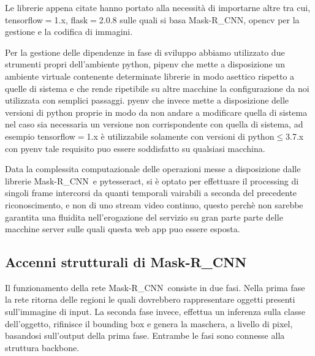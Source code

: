\documentclass[12pt,a4paper]{article}
\newcommand{\mrcnn}{Mask-R\_CNN}
\begin{document}
Le librerie appena citate hanno portato alla necessità di importarne
altre tra cui, tensorflow$=$1.x, flask$=$2.0.8 sulle quali si basa
\mrcnn, opencv per la gestione e la codifica di immagini.

Per la gestione delle dipendenze in fase di sviluppo abbiamo utilizzato
due strumenti propri dell'ambiente python, pipenv che mette a
disposizione un ambiente virtuale contenente determinate librerie in
modo asettico rispetto a quelle di sistema e che rende ripetibile su
altre macchine la configurazione da noi utilizzata con semplici
passaggi. pyenv che invece mette a disposizione delle versioni di python
proprie in modo da non andare a modificare quella di sistema nel caso
sia necessaria un versione non corrispondente con quella di sistema, ad
esempio tensorflow$=$1.x è utilizzabile solamente con versioni di
python$\leq$3.7.x con pyenv tale requisito puo essere soddisfatto su
qualsiasi macchina.

Data la complessita computazionale delle operazioni messe a disposizione
dalle librerie \mrcnn\ e pytesseract, si è optato per effettuare il
processing di singoli frame intercorsi da quanti temporali vairabili a
seconda del precedente riconoscimento, e non di uno stream video
continuo, questo perchè non sarebbe garantita una fluidita
nell'erogazione del servizio su gran parte parte delle macchine server
sulle quali questa web app puo essere esposta.

\subsection{Accenni strutturali di \mrcnn}

Il funzionamento della rete \mrcnn\ consiste in due fasi. Nella prima
fase la rete ritorna delle regioni le quali dovrebbero rappresentare
oggetti presenti sull'immagine di input. La seconda fase invece,
effettua un inferenza sulla classe dell'oggetto, rifinisce il bounding
box e genera la maschera, a livello di pixel, basandosi sull'output
della prima fase. Entrambe le fasi sono connesse alla struttura
backbone.
\end{document}
